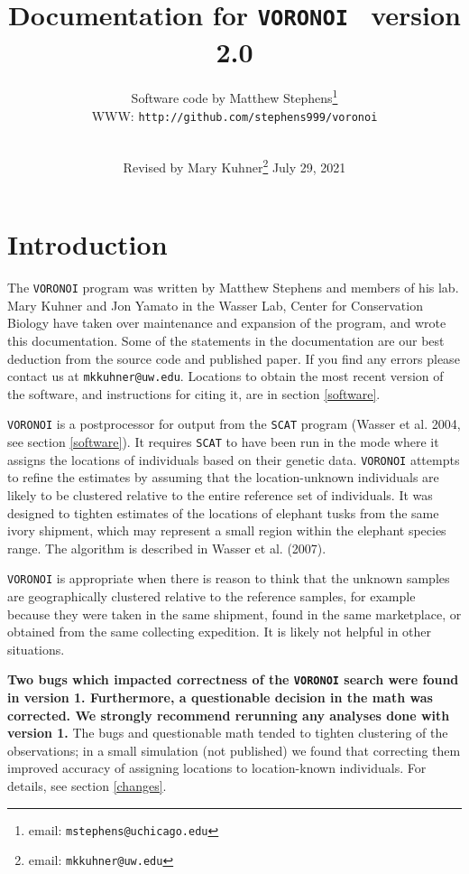 \documentclass[10pt,titlepage,times,letterpaper]{article}
\def\SCAT{{\tt SCAT} }
\def\VORONOI{{\tt VORONOI} }
\begin{document}
\title{Documentation for {\tt \VORONOI} version 2.0}

\author{
Software code by Matthew Stephens\footnote{email: {\tt mstephens@uchicago.edu}} \\
WWW: {\tt http://github.com/stephens999/voronoi}\\
\\
}

\date{Revised by Mary Kuhner\footnote{email:  {\tt mkkuhner@uw.edu}} July 29, 2021}


\maketitle

\tableofcontents
\vfil\eject
\section{Introduction}
The \VORONOI program was written by Matthew Stephens and members of his lab.  Mary Kuhner
and Jon Yamato in the Wasser Lab, Center for Conservation Biology
have taken over maintenance and expansion of the program, and wrote this documentation.
Some of the statements in the documentation are our best deduction from the source code
and published paper.  If you find any errors please contact us at {\tt mkkuhner@uw.edu}.
Locations to obtain the most recent version of the software, and instructions for citing
it, are in section \ref{software}.

\VORONOI is a postprocessor for output from the \SCAT program (Wasser et al. 2004, see
section \ref{software}).
It requires \SCAT to have been run in the mode where
it assigns the locations of individuals based on their genetic data.  \VORONOI attempts
to refine the estimates by assuming that the location-unknown individuals are likely to
be clustered relative to the entire reference set of individuals.  It was designed to
tighten estimates of the locations of elephant tusks from the same ivory shipment, which
may represent a small region within the elephant species range.  The algorithm is
described in Wasser et al. (2007).

\VORONOI is appropriate when there is reason to think that the unknown samples are
geographically clustered relative to the reference samples, for example
because they were taken in the same shipment, found in the same marketplace, or
obtained from the same collecting expedition.  It is likely not helpful in other
situations.

{\bf Two bugs which impacted correctness of the \VORONOI search were found in version 1.
Furthermore, a questionable decision in the math was corrected.
We strongly recommend rerunning any analyses done with version 1.}  The bugs and
questionable math tended to tighten clustering of the observations; in a small
simulation (not published) we found that correcting them improved accuracy of
assigning locations to location-known individuals.  For details, see section \ref{changes}.
\end{document}
